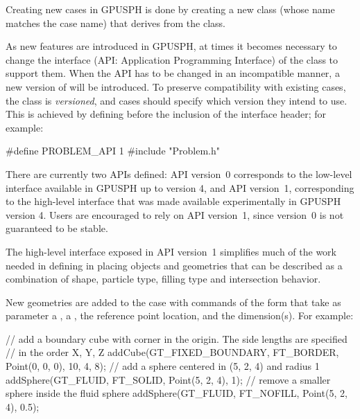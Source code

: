 \documentclass{../GPUSPHtemplate}
\begin{document}

Creating new cases in GPUSPH is done by creating a new class
(whose name matches the case name) that derives from the 
class.

As new features are introduced in GPUSPH, at times it becomes necessary
to change the interface (API: Application Programming Interface) of the
 class to support them. When the API has to be changed in an
incompatible manner, a new version of  will be introduced. To
preserve compatibility with existing cases, the  class
is \emph{versioned}, and cases should specify which version they intend to use.
This is achieved by defining  before the inclusion of
the  interface header; for example:

\begin{ccode}
#define PROBLEM_API 1
#include "Problem.h"
\end{ccode}

There are currently two  APIs defined: API version~0
corresponds to the low-level  interface available in GPUSPH
up to version 4, and API version~1, corresponding to the high-level
interface that was made available experimentally in GPUSPH version 4.
Users are encouraged to rely on API version~1, since version~0 is not
guaranteed to be stable.

The high-level  interface exposed in API version~1
simplifies much of the work needed in defining in placing objects and
geometries that can be described as a combination of shape, particle
type, filling type and intersection behavior.

New geometries are added to the case with commands of the form
 that take as parameter a
, a , the reference point location,
and the dimension(s). For example:

\begin{ccode}
// add a boundary cube with corner in the origin. The side lengths are specified
// in the order X, Y, Z
addCube(GT_FIXED_BOUNDARY, FT_BORDER, Point(0, 0, 0), 10, 4, 8);
// add a sphere centered in (5, 2, 4) and radius 1
addSphere(GT_FLUID, FT_SOLID, Point(5, 2, 4), 1);
// remove a smaller sphere inside the fluid sphere
addSphere(GT_FLUID, FT_NOFILL, Point(5, 2, 4), 0.5);
\end{ccode}
\end{document}
